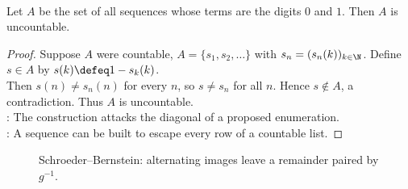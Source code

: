 \begin{theorem} \label{thm:binary-sequences-uncountable} \\
Let $A$ be the set of all sequences whose terms are the digits $0$ and $1$. Then $A$ is uncountable.
\begin{proof}
Suppose $A$ were countable, $A=\{s_1,s_2,\ldots\}$ with $s_n=(s_n(k))_{k\in\N}$. Define $s\in A$ by $s(k)\defeq 1-s_k(k)$.\\
Then $s(n)\neq s_n(n)$ for every $n$, so $s\neq s_n$ for all $n$. Hence $s\notin A$, a contradiction. Thus $A$ is uncountable.\\
: The construction attacks the diagonal of a proposed enumeration.\\
: A sequence can be built to escape every row of a countable list.
\end{proof}
\end{theorem}

\begin{figure}[H]
  \centering
  
  \caption{Schroeder--Bernstein: alternating images leave a remainder paired by $g^{-1}$.}
  \label{fig:schroeder-bernstein-ladder}
\end{figure}


